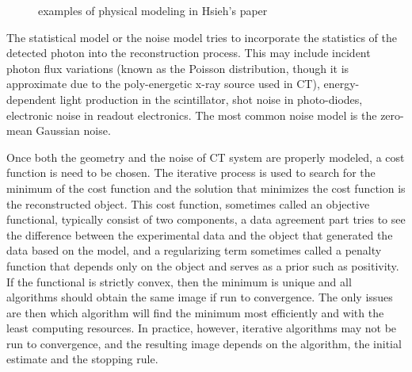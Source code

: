 \begin{figure}
\centering
	\begin{subfigure}[b]{0.4\linewidth}
	\centering
	\end{subfigure}
\hspace{0.2cm}
	\begin{subfigure}[b]{0.4\linewidth}
	\centering
	\end{subfigure}
\caption{examples of physical modeling in Hsieh's paper}
\label{fig:physical_modeling}
\end{figure}

The statistical model or the noise model tries to incorporate the statistics of the detected photon into the reconstruction process.  This may include incident photon flux variations (known as the Poisson distribution, though it is approximate due to the poly-energetic x-ray source used in CT), energy-dependent light production in the scintillator, shot noise in photo-diodes, electronic noise in readout electronics. The most common noise model is the zero-mean Gaussian noise.

Once both the geometry and the noise of CT system are properly modeled, a cost function is need to be chosen.  The iterative process is used to search for the minimum of the cost function and the solution that minimizes the cost function is the reconstructed object.  This cost function, sometimes called an objective functional, typically consist of two components, a data agreement part tries to see the difference between the experimental data and the object that generated the data based on the model, and a regularizing term sometimes called a penalty function that depends only on the object and serves as a prior such as positivity.  If the functional is strictly convex, then the minimum is unique and all algorithms should obtain the same image if run to convergence.  The only issues are then which algorithm will find the minimum most efficiently and with the least computing resources.  In practice, however, iterative algorithms may not be run to convergence, and the resulting image depends on the algorithm, the initial estimate and the stopping rule.


